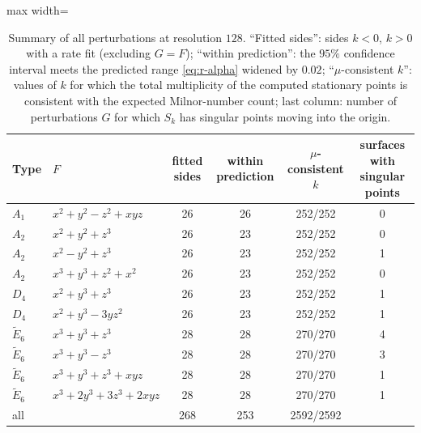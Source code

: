 \documentclass[12pt, a4paper, oneside]{book}
\theoremstyle{plain}
\theoremstyle{definition}
\theoremstyle{remark}
\theoremstyle{definition}
\begin{document}
\begin{table}[!h]
\centering
\small
\begin{adjustbox}{max width=\textwidth}
\begin{tabular}{l l c c c c}
\toprule
Type & $F$ & fitted sides & within prediction & $\mu$-consistent $k$ & surfaces with singular points \\
\midrule
$A_1$ & $x^2+y^2-z^2+xyz$ & 26 & 26 & 252/252 & 0 \\
$A_2$ & $x^2+y^2+z^3$ & 26 & 23 & 252/252 & 0 \\
$A_2$ & $x^2-y^2+z^3$ & 26 & 23 & 252/252 & 1 \\
$A_2$ & $x^3+y^3+z^2+x^2$ & 26 & 23 & 252/252 & 0 \\
$D_4$ & $x^2+y^3+z^3$ & 26 & 23 & 252/252 & 1 \\
$D_4$ & $x^2+y^3-3yz^2$ & 26 & 23 & 252/252 & 1 \\
$\tilde E_6$ & $x^3+y^3+z^3$ & 28 & 28 & 270/270 & 4 \\
$\tilde E_6$ & $x^3+y^3-z^3$ & 28 & 28 & 270/270 & 3 \\
$\tilde E_6$ & $x^3+y^3+z^3+xyz$ & 28 & 28 & 270/270 & 1 \\
$\tilde E_6$ & $x^3+2y^3+3z^3+2xyz$ & 28 & 28 & 270/270 & 1 \\
\midrule
all & & 268 & 253 & 2592/2592 & \\
\bottomrule
\end{tabular}
\end{adjustbox}
\caption[Summary of all experiments]{Summary of all perturbations at resolution $128$. ``Fitted sides'': sides $k<0$, $k>0$ with a rate fit (excluding $G=F$); ``within prediction'': the $95\%$ confidence interval meets the predicted range \eqref{eq:r-alpha} widened by $0.02$; ``$\mu$-consistent $k$'': values of $k$ for which the total multiplicity of the computed stationary points is consistent with the expected Milnor-number count; last column: number of perturbations $G$ for which $S_k$ has singular points moving into the origin.}
\label{tab:summary}
\end{table}
\end{document}
